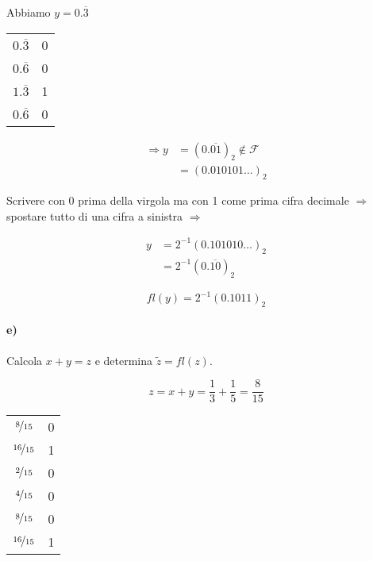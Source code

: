 Abbiamo $y=0.\overline{3}$

\begin{table}[H]
\centering
\begin{tabular}{c|c}
$0.\overline{3}$ & 0                      \\
$0.\overline{6}$ & 0                      \\
$1.\overline{3}$ & \multicolumn{1}{c|}{1} \\
$0.\overline{6}$ & \multicolumn{1}{c|}{0}
\end{tabular}
\end{table}

\begin{equation*}
\begin{split}
  \Rightarrow y &= (0.\overline{01})_2 \not\in \mathcal{F}\\
                &= (0.010101\ldots )_2
\end{split}
\end{equation*}

Scrivere con 0 prima della virgola ma con 1 come prima cifra decimale $\Rightarrow$ spostare tutto di una cifra a sinistra $\Rightarrow$ 

\begin{equation*}
\begin{split}
  y &= 2^{-1}(0.101010\ldots )_2\\
    &= 2^{-1}(0.\overline{10})_2
\end{split}
\end{equation*}

\begin{equation*}
  fl(y)=2^{-1}(0.1011)_2
\end{equation*}


\paragraph{e)} Calcola $x+y=z$ e determina $\tilde{z}=fl(z)$.

\begin{equation*}
  z = x+y = \dfrac{1}{3} + \dfrac{1}{5} = \dfrac{8}{15}
\end{equation*}

\begin{table}[H]
\centering
\begin{tabular}{c|c}
$\nicefrac{8}{15}$  & 0                      \\
$\nicefrac{16}{15}$ & \multicolumn{1}{c|}{1} \\
$\nicefrac{2}{15}$  & \multicolumn{1}{c|}{0} \\
$\nicefrac{4}{15}$  & \multicolumn{1}{c|}{0} \\
$\nicefrac{8}{15}$  & \multicolumn{1}{c|}{0} \\
$\nicefrac{16}{15}$ & 1                     
\end{tabular}
\end{table}

